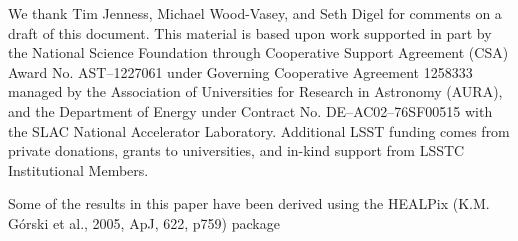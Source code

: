 \documentclass[]{spie}
\begin{document}
We thank Tim Jenness, Michael Wood-Vasey, and Seth Digel for comments on a draft of this document.  This material is based upon work supported in part by the National Science Foundation through Cooperative Support Agreement (CSA) Award No. AST–1227061 under Governing Cooperative Agreement 1258333 managed by the Association of Universities for Research in Astronomy (AURA), and the Department of Energy under Contract No. DE–AC02–76SF00515 with the SLAC National Accelerator Laboratory. Additional LSST funding comes from private donations, grants to universities, and in-kind support from LSSTC Institutional Members.

Some of the results in this paper have been derived using the HEALPix (K.M. Górski et al., 2005, ApJ, 622, p759) package



\end{document}
